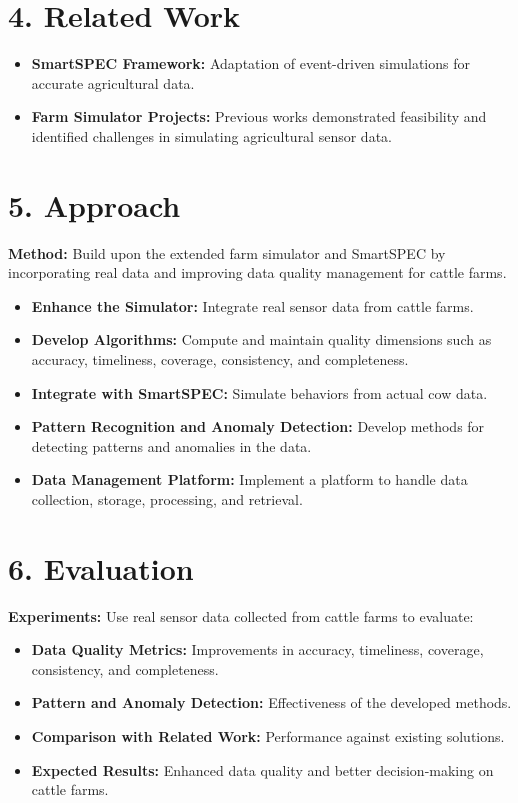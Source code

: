 \documentclass[12pt]{article}
\begin{document}
\section*{4. Related Work}
\begin{itemize}
    \item \textbf{SmartSPEC Framework:} Adaptation of event-driven simulations for accurate agricultural data.
    \item \textbf{Farm Simulator Projects:} Previous works demonstrated feasibility and identified challenges in simulating agricultural sensor data.
\end{itemize}

\section*{5. Approach}
\textbf{Method:} Build upon the extended farm simulator and SmartSPEC by incorporating real data and improving data quality management for cattle farms.
\begin{itemize}
    \item \textbf{Enhance the Simulator:} Integrate real sensor data from cattle farms.
    \item \textbf{Develop Algorithms:} Compute and maintain quality dimensions such as accuracy, timeliness, coverage, consistency, and completeness.
    \item \textbf{Integrate with SmartSPEC:} Simulate behaviors from actual cow data.
    \item \textbf{Pattern Recognition and Anomaly Detection:} Develop methods for detecting patterns and anomalies in the data.
    \item \textbf{Data Management Platform:} Implement a platform to handle data collection, storage, processing, and retrieval.
\end{itemize}

\section*{6. Evaluation}
\textbf{Experiments:} Use real sensor data collected from cattle farms to evaluate:
\begin{itemize}
    \item \textbf{Data Quality Metrics:} Improvements in accuracy, timeliness, coverage, consistency, and completeness.
    \item \textbf{Pattern and Anomaly Detection:} Effectiveness of the developed methods.
    \item \textbf{Comparison with Related Work:} Performance against existing solutions.
    \item \textbf{Expected Results:} Enhanced data quality and better decision-making on cattle farms.
\end{itemize}
\end{document}

